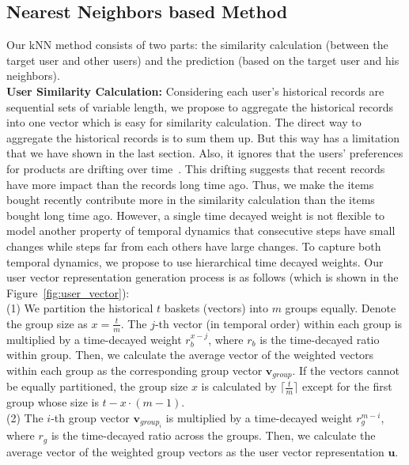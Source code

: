 \documentclass[sigconf]{acmart}
\begin{document}
\subsection{Nearest Neighbors based Method}
\label{sec:representation}
Our kNN method consists of  two parts: the similarity calculation (between the target user and other users) and the prediction (based on the target user and his neighbors).\\ 
\textbf{User Similarity Calculation:} Considering each  user's historical records are  sequential sets of variable length, we propose to aggregate the historical records  into one vector which is easy for similarity calculation. The direct way to aggregate the  historical records is to sum them up. But this way has a limitation that we have shown in the last section. Also, it ignores that the users' preferences for products are drifting over time~\cite{koren2009collaborative}. This drifting  suggests that recent  records have more impact  than the records long time ago. Thus, we make the  items bought recently  contribute more in  the similarity calculation than the items bought long time ago. However, a single time decayed weight is not flexible to model another  property of temporal  dynamics that consecutive  steps have small changes  while  steps far from each others have large changes. To capture both temporal  dynamics, we propose to use  hierarchical time decayed weights. Our user vector representation generation process is as follows (which is shown in the Figure~\ref{fig:user_vector}): 
\\(1) We partition the historical $t$ baskets (vectors)  into $m$ groups equally. Denote the  group size as  $x=\frac{t}{m}$. The  $j$-th vector (in temporal order) within each group is  multiplied by a time-decayed weight  $r_{b}^{x-j}$, where $r_{b}$ is the time-decayed ratio within group. Then, we calculate the average vector of the weighted vectors within each group as the  corresponding group vector  $\mathbf{v}_{group}$. If the vectors cannot be equally partitioned,  the group size $x$ is calculated by $\lceil \frac{t}{m}  \rceil$ except for the first group whose size is $t-x\cdot(m-1)$. 
\\
(2) The $i$-th group vector  $\mathbf{v}_{group_i}$ is multiplied by a time-decayed weight $r_{g}^{m-i}$, where  $r_{g}$ is the  time-decayed ratio across the groups. Then, we calculate the average vector of the weighted group vectors   as the user vector representation  $\mathbf{u}$. 
\end{document}
